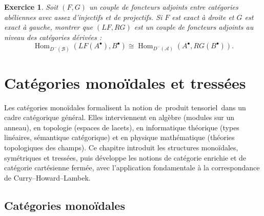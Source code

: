 \documentclass[a4paper,12pt]{book}
\DeclareMathOperator{\Hom}{Hom}
\newtheorem{exercice}{Exercice}[chapter]
\providecommand{\og}{\guillemotleft\,}
\providecommand{\fg}{\,\guillemotright}
\begin{document}
\begin{exercice}\label{exo:derived-adjunction}
Soit $(F, G)$ un couple de foncteurs adjoints entre catégories abéliennes
avec assez d'injectifs et de projectifs. Si $F$ est exact à droite et $G$
est exact à gauche, montrer que $(LF, RG)$ est un couple de foncteurs
adjoints au niveau des catégories dérivées :
\[
  \Hom_{D^-(\mathcal{B})}(LF(A^\bullet), B^\bullet)
  \cong \Hom_{D^-(\mathcal{A})}(A^\bullet, RG(B^\bullet)).
\]
\end{exercice}



\chapter{Catégories monoïdales et tressées}\label{ch:monoidales}
\minitoc

\vspace{1em}

Les catégories monoïdales formalisent la notion de \og produit tensoriel\fg{}
dans un cadre catégorique général.  Elles interviennent en algèbre
(modules sur un anneau), en topologie (espaces de lacets),
en informatique théorique (types linéaires, sémantique catégorique)
et en physique mathématique (théories topologiques des champs).
Ce chapitre introduit les structures monoïdales, symétriques et tressées,
puis développe les notions de catégorie enrichie et de catégorie
cartésienne fermée, avec l'application fondamentale à la correspondance
de Curry--Howard--Lambek.


\section{Catégories monoïdales}\label{sec:cat-monoidale}
\end{document}
